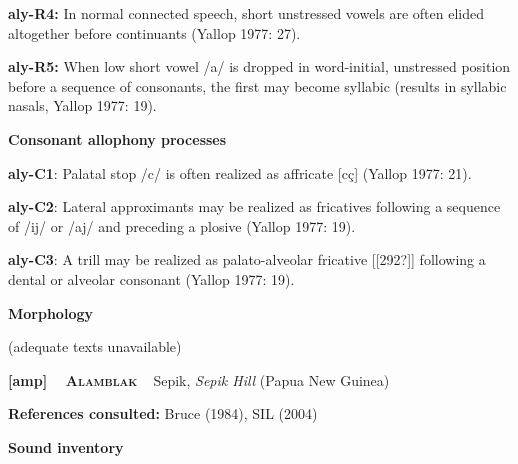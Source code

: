 \begin{styleBody}
\textbf{aly-R4:} In normal connected speech, short unstressed vowels are often elided altogether before continuants (Yallop 1977: 27).
\end{styleBody}

\begin{styleBody}
\textbf{aly-R5:} When low short vowel /a/ is dropped in word-initial, unstressed position before a sequence of consonants, the first may become syllabic (results in syllabic nasals, Yallop 1977: 19).
\end{styleBody}

\begin{styleBody}
\textbf{Consonant allophony processes}
\end{styleBody}

\begin{styleBody}
\textbf{aly-C1}: Palatal stop /c/ is often realized as affricate [cç] (Yallop 1977: 21).
\end{styleBody}

\begin{styleBody}
\textbf{aly-C2}: Lateral approximants may be realized as fricatives following a sequence of /ij/ or /aj/ and preceding a plosive (Yallop 1977: 19).
\end{styleBody}

\begin{styleBody}
\textbf{aly-C3}: A trill may be realized as palato-alveolar fricative [[292?]] following a dental or alveolar consonant (Yallop 1977: 19).
\end{styleBody}

\begin{styleBody}
\textbf{Morphology}
\end{styleBody}

\begin{styleBody}
(adequate texts unavailable)
\end{styleBody}

\clearpage\begin{styleBody}
\textbf{[amp] }\ \ \textbf{\textsc{Alamblak}}\textbf{\ \ }Sepik, \textit{Sepik Hill} (Papua New Guinea)
\end{styleBody}

\begin{styleBody}
\textbf{References consulted: }Bruce (1984), SIL (2004)
\end{styleBody}

\begin{styleBody}
\textbf{Sound inventory}
\end{styleBody}

